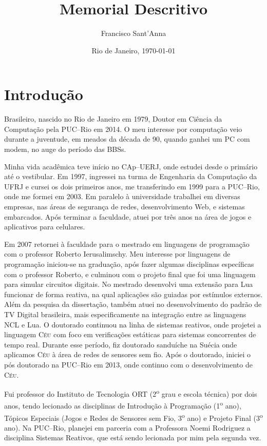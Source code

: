 \documentclass[12pt,a4paper]{article}
\title{Memorial Descritivo}
\author{Francisco Sant'Anna}
\date{Rio de Janeiro, \today}
\newcommand{\CEU}{\textsc{C\'{e}u}\xspace}
\begin{document}
\maketitle

\section*{Introdução}

Brasileiro, nascido no Rio de Janeiro em 1979, Doutor em Ciência da Computação 
pela PUC--Rio em 2014.
%
O meu interesse por computação veio durante a juventude, em meados da década de 
90, quando ganhei um PC com modem, no auge do período das BBSs.

Minha vida acadêmica teve início no CAp--UERJ, onde estudei desde o primário 
até o vestibular.
%
Em 1997, ingressei na turma de Engenharia da Computação da UFRJ e cursei os 
dois primeiros anos, me transferindo em 1999 para a PUC--Rio, onde me formei em 
2003.
%
Em paralelo à universidade trabalhei em diversas empresas, nas áreas de 
segurança de redes, desenvolvimento Web, e sistemas embarcados.
%
Após terminar a faculdade, atuei por três anos na área de jogos e aplicativos 
para celulares.

Em 2007 retornei à faculdade para o mestrado em linguagens de programação com o 
professor Roberto Ierusalimschy.
%
Meu interesse por linguagens de programação iniciou-se na graduação, após fazer 
algumas disciplinas específicas com o professor Roberto, e culminou com o 
projeto final que foi uma linguagem para simular circuitos digitais.
%
No mestrado desenvolvi uma extensão para Lua funcionar de forma reativa, na 
qual aplicações são guiadas por estímulos externos.
%
Além da pesquisa da dissertação, também atuei no desenvolvimento do padrão de 
TV Digital brasileira, mais especificamente na integração entre as linguagens 
NCL e Lua.
%
O doutorado continuou na linha de sistemas reativos, onde projetei a linguagem 
\CEU com foco em verificações estáticas para sistemas concorrentes de tempo 
real.
Durante esse período, fiz doutorado sanduíche na Suécia onde aplicamos \CEU à 
área de redes de sensores sem fio.
%
Após o doutorado, iniciei o pós doutorado na PUC--Rio em 2013, onde continuo 
com o desenvolvimento de \CEU.

Fui professor do Instituto de Tecnologia ORT (2\textsuperscript{o} grau e 
escola técnica) por dois anos, tendo lecionado as disciplinas de Introdução à 
Programação (1\textsuperscript{o} ano), Tópicos Especiais (Jogos e Redes de 
Sensores sem Fio, 3\textsuperscript{o} ano) e Projeto Final 
(3\textsuperscript{o} ano).
%
Na PUC--Rio, planejei em parceria com a Professora Noemi Rodriguez a disciplina 
Sistemas Reativos, que está sendo lecionada por mim pela segunda vez.
\end{document}
